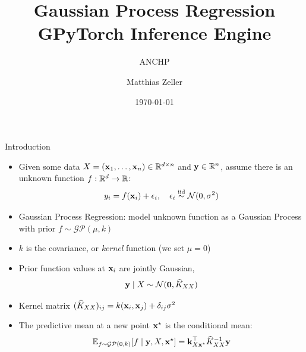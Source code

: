 \documentclass{beamer}
\title{Gaussian Process Regression\\GPyTorch Inference Engine}
\subtitle{ANCHP}
\author{Matthias Zeller}
\date{\today}
\begin{document}
\frame{\titlepage}


\begin{frame}{Introduction}
\begin{itemize}[<+->]
    \item Given some data $X = (\boldsymbol{\mathbf{x}}_1, \ldots, \boldsymbol{\mathbf{x}}_n) \in \mathbb R^{d \times n}$ and $\boldsymbol{\mathbf{y}} \in \mathbb R^n$, assume there is an unknown function $f: \mathbb R^d \to \mathbb R$:
    \begin{equation*}
        y_i = f(\boldsymbol{\mathbf{x}}_i) + \epsilon_i, \quad \epsilon_i \stackrel{\text{iid}}{\sim} \mathcal N(0, \sigma^2)
    \end{equation*}
    
    \item Gaussian Process Regression: model unknown function as a Gaussian Process with prior $f \sim \mathcal{GP}(\mu, k)$
    \item $k$ is the covariance, or \emph{kernel} function (we set $\mu = 0$)
    \item Prior function values at $\boldsymbol{\mathbf{x}}_i$ are jointly Gaussian,
    \begin{equation*}
        \boldsymbol{\mathbf{y}} \mid X \sim \mathcal N(\boldsymbol{\mathbf{0}}, \widehat K_{XX})
    \end{equation*}
    \item Kernel matrix $(\widehat K_{XX})_{ij} = k(\boldsymbol{\mathbf{x}}_i, \boldsymbol{\mathbf{x}}_j) + \delta_{ij} \sigma^2$
    \item The predictive mean at a new point $\boldsymbol{\mathbf{x}}^\star$ is the conditional mean:
    \begin{equation*}
        \operatorname{\mathbb{E}}_{f \sim \mathcal{GP}(0, k)}[f \mid \boldsymbol{\mathbf{y}},  X, \boldsymbol{\mathbf{x}}^\star ] = \boldsymbol{\mathbf{k}}_{X \boldsymbol{\mathbf{x}}^\star}^\top \widehat K_{XX}^{-1} \boldsymbol{\mathbf{y}}
    \end{equation*}
\end{itemize}

\end{frame}
\end{document}
